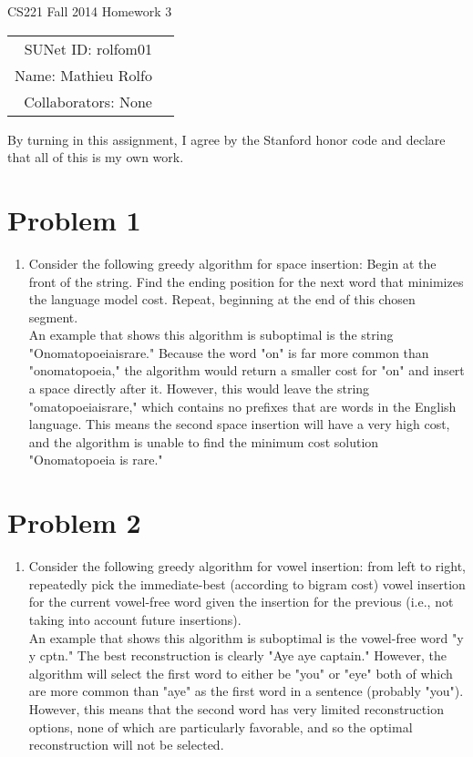 \documentclass[12pt]{article}
\begin{document}
\begin{center}
{\Large CS221 Fall 2014 Homework 3}

\begin{tabular}{rl}
\\
SUNet ID: rolfom01 \\
Name: Mathieu Rolfo \\
Collaborators: None \\
\end{tabular}
\end{center}

By turning in this assignment, I agree by the Stanford honor code and declare
that all of this is my own work.

\section*{Problem 1}

\begin{enumerate}[label=(\alph*)]
  \item Consider the following greedy algorithm for space insertion: Begin at the front of the string. Find the ending position for the next word that minimizes the language model cost. Repeat, beginning at the end of this chosen segment. \\ An example that shows this algorithm is suboptimal is the string "Onomatopoeiaisrare." Because the word "on" is far more common than "onomatopoeia," the algorithm would return a smaller cost for "on" and insert a space directly after it. However, this would leave the string "omatopoeiaisrare," which contains no prefixes that are words in the English language. This means the second space insertion will have a very high cost, and the algorithm is unable to find the minimum cost solution "Onomatopoeia is rare."
\end{enumerate}

\section*{Problem 2}

\begin{enumerate}[label=(\alph*)]
  \item Consider the following greedy algorithm for vowel insertion: from left to right, repeatedly pick the immediate-best (according to bigram cost) vowel insertion for the current vowel-free word given the insertion for the previous (i.e., not taking into account future insertions). \\ An example that shows this algorithm is suboptimal is the vowel-free word "y y cptn." The best reconstruction is clearly "Aye aye captain." However, the algorithm will select the first word to either be "you" or "eye" both of which are more common than "aye" as the first word in a sentence (probably "you"). However, this means that the second word has very limited reconstruction options, none of which are particularly favorable, and so the optimal reconstruction will not be selected.
\end{enumerate}
\end{document}
